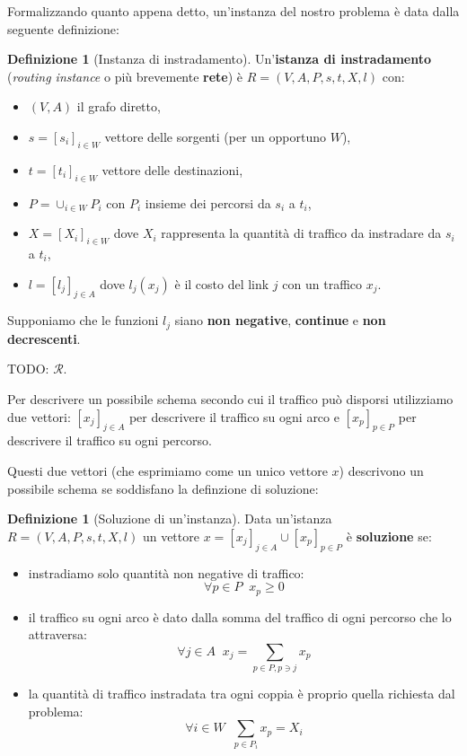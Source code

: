 \documentclass[a4paper]{article}
\newcounter{counter1}
\theoremstyle{plain}
\theoremstyle{definition}
\newtheorem{mydef}[counter1]{Definizione}
\theoremstyle{remark}
\newcommand{\bra}[1]{\left[#1\right]}
\begin{document}
Formalizzando quanto appena detto, un'instanza del nostro problema è
data dalla seguente definizione:

\begin{mydef}[Instanza di instradamento]
  Un'\textbf{istanza di instradamento} (\textit{routing instance} o
  più brevemente \textbf{rete}) è $R=(V,A,P,s,t,X,l)$ con:
  \begin{itemize}
  \item $(V,A)$ il grafo diretto,
  \item $s = \bra{s_i}_{i\in W}$ vettore delle sorgenti (per un opportuno $W$),
  \item $t = \bra{t_i}_{i\in W}$ vettore delle destinazioni,
  \item $P = \cup _{i\in W} P_i$ con $P_i$ insieme dei
    percorsi da $s_i$ a $t_i$,
  \item $X = \bra{X_i}_{i\in W}$ dove $X_i$ rappresenta la quantità di
    traffico da instradare da $s_i$ a $t_i$,
  \item $l = \bra{l_j}_{j\in A}$ dove $l_j(x_j)$ è il costo del link
    $j$ con un traffico $x_j$.
  \end{itemize}
  Supponiamo che le funzioni $l_j$ siano \textbf{non negative},
  \textbf{continue} e \textbf{non decrescenti}.
\end{mydef}

TODO: $\mathcal{R}$.

Per descrivere un possibile schema secondo cui il traffico può
disporsi utilizziamo due vettori: $\bra{x_j}_{j\in A}$ per descrivere
il traffico su ogni arco e $\bra{x_p}_{p\in P}$ per descrivere il
traffico su ogni percorso.

Questi due vettori (che esprimiamo come un unico vettore $x$)
descrivono un possibile schema se soddisfano la definzione di soluzione:

\begin{mydef}[Soluzione di un'instanza]
  Data un'istanza $R=(V,A,P,s,t,X,l)$ un vettore
  $x = \bra{x_j}_{j\in A} \cup \bra{x_p}_{p\in P}$ è \textbf{soluzione} se:
  \begin{itemize}
  \item instradiamo solo quantità non negative di traffico: \[ \forall p\in P\;\; x_p \ge 0\]
  \item il traffico su ogni arco è dato dalla somma del traffico di
    ogni percorso che lo attraversa: \[ \forall j\in A\;\; x_j = \sum_{p\in P,p\ni j} x_p\]
  \item la quantità di traffico instradata tra ogni coppia è proprio
    quella richiesta dal problema: \[\forall i\in W\;\; \sum_{p\in P_i} x_p = X_i\]
  \end{itemize}
\end{mydef}
\end{document}

